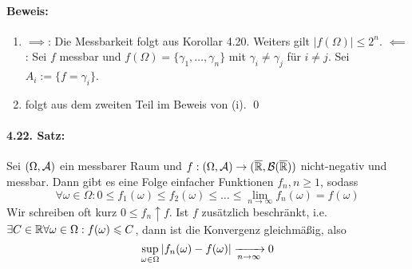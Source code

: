 \documentclass[12pt]{report}
\begin{document}
\paragraph{Beweis:}
\begin{enumerate}[label=(\roman*)]
    \item $\implies$: Die Messbarkeit folgt aus Korollar 4.20. Weiters gilt $|f(\Omega)|\leq2^n$.\newline
    $\impliedby$: Sei $f$ messbar und $f(\Omega)=\{\gamma_1,\hdots,\gamma_n\}$ mit $\gamma_i\neq\gamma_j$ f\"ur $i\neq j$. Sei $A_i:=\{f=\gamma_i\}$.
    \item folgt aus dem zweiten Teil im Beweis von (i). \qed
\end{enumerate}
 
 \paragraph{4.22. Satz:}Sei $(\Omega,\mathcal{A})$ ein messbarer Raum und $f:(\Omega,\mathcal{A})\to(\overline{\mathbb{R}},\mathcal{B}(\overline{\mathbb{R}}))$ nicht-negativ und messbar. Dann gibt es eine Folge einfacher Funktionen $f_n,n\geq1$, sodass
 $$\forall\omega\in\Omega:0\leq f_1(\omega)\leq f_2(\omega)\leq\hdots\leq \lim_{n\to\infty}f_n(\omega)=f(\omega)$$
 Wir schreiben oft kurz $0\leq f_n\uparrow f$. Ist $f$ zus\"atzlich beschr\"ankt, i.e. $\exists C\in\mathbb{R}\forall\omega\in\Omega:f(\omega)\leqslant C$, dann ist die Konvergenz gleichm\"a\ss{}ig, also
 $$\sup_{\omega\in\Omega}\left|f_n(\omega)-f(\omega)\right|\nto{}{n\to\infty}0$$
 
\end{document}
